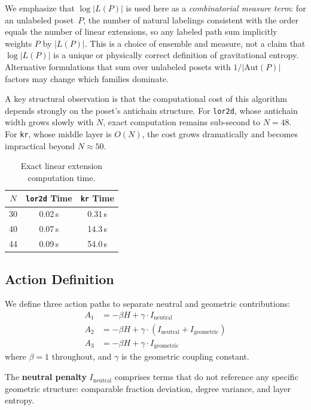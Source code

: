 \documentclass[entropy,article,submit,pdftex,moreauthors]{Definitions/mdpi}
\begin{document}
We emphasize that $\log|L(P)|$ is used here as a \emph{combinatorial measure term}: for an unlabeled poset~$P$, the number of natural labelings consistent with the order equals the number of linear extensions, so any labeled path sum implicitly weights $P$ by $|L(P)|$. This is a choice of ensemble and measure, not a claim that $\log|L(P)|$ is a unique or physically correct definition of gravitational entropy. Alternative formulations that sum over unlabeled posets with $1/|\mathrm{Aut}(P)|$ factors may change which families dominate.

A key structural observation is that the computational cost of this algorithm depends strongly on the poset's antichain structure. For \texttt{lor2d}, whose antichain width grows slowly with $N$, exact computation remains sub-second to $N = 48$. For \texttt{kr}, whose middle layer is $O(N)$, the cost grows dramatically and becomes impractical beyond $N \approx 50$.

\begin{table}[H]
\caption{Exact linear extension computation time.\label{tab:timing}}
\begin{tabular}{ccc}
\toprule
\boldmath$N$ & \texttt{lor2d} Time & \texttt{kr} Time \\
\midrule
30 & 0.02\,s & 0.31\,s \\
40 & 0.07\,s & 14.3\,s \\
44 & 0.09\,s & 54.0\,s \\
\bottomrule
\end{tabular}
\end{table}

\subsection{Action Definition}

We define three action paths to separate neutral and geometric contributions:
\begin{align}
    A_1 &= -\beta H + \gamma \cdot I_{\text{neutral}} \label{eq:A1} \\
    A_2 &= -\beta H + \gamma \cdot (I_{\text{neutral}} + I_{\text{geometric}}) \label{eq:A2} \\
    A_3 &= -\beta H + \gamma \cdot I_{\text{geometric}} \label{eq:A3}
\end{align}
where $\beta = 1$ throughout, and $\gamma$ is the geometric coupling constant.

The \textbf{neutral penalty} $I_{\text{neutral}}$ comprises terms that do not reference any specific geometric structure: comparable fraction deviation, degree variance, and layer entropy.
\end{document}
